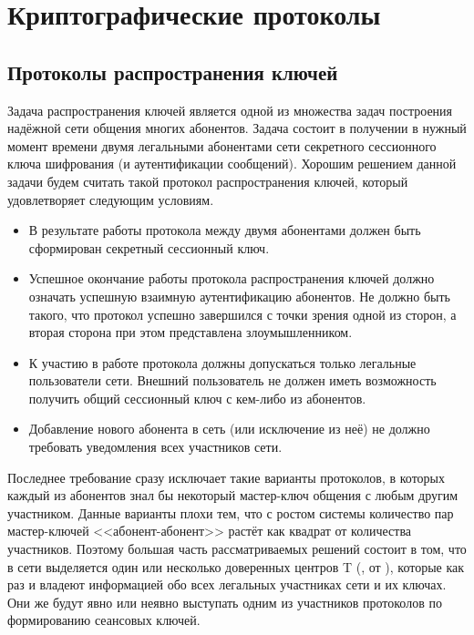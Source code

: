 \chapter{Криптографические протоколы}\label{chapter-protocols}











\section{Протоколы распространения ключей}

Задача распространения ключей является одной из множества задач построения надёжной сети общения многих абонентов. Задача состоит в получении в нужный момент времени двумя легальными абонентами сети секретного сессионного ключа шифрования (и аутентификации сообщений). Хорошим решением данной задачи будем считать такой протокол распространения ключей, который удовлетворяет следующим условиям.

\begin{itemize}
	\item В результате работы протокола между двумя абонентами должен быть сформирован секретный сессионный ключ.
	\item Успешное окончание работы протокола распространения ключей должно означать успешную взаимную аутентификацию абонентов. Не должно быть такого, что протокол успешно завершился с точки зрения одной из сторон, а вторая сторона при этом представлена злоумышленником.
	\item К участию в работе протокола должны допускаться только легальные пользователи сети. Внешний пользователь не должен иметь возможность получить общий сессионный ключ с кем-либо из абонентов.
	\item Добавление нового абонента в сеть (или исключение из неё) не должно требовать уведомления всех участников сети.
\end{itemize}

Последнее требование сразу исключает такие варианты протоколов, в которых каждый из абонентов знал бы некоторый мастер-ключ общения с любым другим участником. Данные варианты плохи тем, что с ростом системы количество пар мастер-ключей <<абонент-абонент>> растёт как квадрат от количества участников. Поэтому большая часть рассматриваемых решений состоит в том, что в сети выделяется один или несколько доверенных центров T (, от ), которые как раз и владеют информацией обо всех легальных участниках сети и их ключах. Они же будут явно или неявно выступать одним из участников протоколов по формированию сеансовых ключей.

